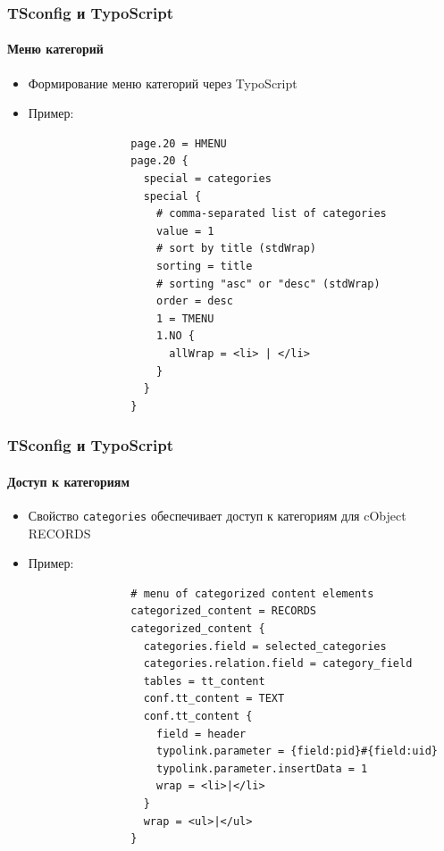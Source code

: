 
\begin{frame}[fragile]
	\frametitle{TSconfig и TypoScript}
	\framesubtitle{Меню категорий}

	\begin{itemize}
		\item Формирование меню категорий через TypoScript

		\item Пример:

			\lstset{
				basicstyle=\tiny\ttfamily
			}

			\begin{lstlisting}
				page.20 = HMENU
				page.20 {
				  special = categories
				  special {
				    # comma-separated list of categories
				    value = 1
				    # sort by title (stdWrap)
				    sorting = title
				    # sorting "asc" or "desc" (stdWrap)
				    order = desc
				    1 = TMENU
				    1.NO {
				      allWrap = <li> | </li>
				    }
				  }
				}
			\end{lstlisting}

	\end{itemize}

\end{frame}


\begin{frame}[fragile]
	\frametitle{TSconfig и TypoScript}
	\framesubtitle{Доступ к категориям}

	\begin{itemize}
		\item Свойство \texttt{categories} обеспечивает доступ к категориям для cObject RECORDS

		\item Пример:

			\lstset{
				basicstyle=\tiny\ttfamily
			}

			\begin{lstlisting}
				# menu of categorized content elements
				categorized_content = RECORDS
				categorized_content {
				  categories.field = selected_categories
				  categories.relation.field = category_field
				  tables = tt_content
				  conf.tt_content = TEXT
				  conf.tt_content {
				    field = header
				    typolink.parameter = {field:pid}#{field:uid}
				    typolink.parameter.insertData = 1
				    wrap = <li>|</li>
				  }
				  wrap = <ul>|</ul>
				}
			\end{lstlisting}

	\end{itemize}

\end{frame}


